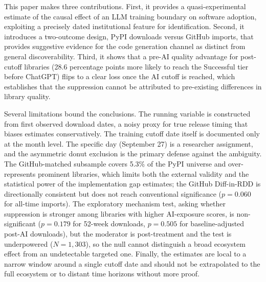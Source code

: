 \documentclass[12pt, a4paper]{report}
\begin{document}
This paper makes three contributions. First, it provides a quasi-experimental estimate of the causal effect of an LLM training boundary on software adoption, exploiting a precisely dated institutional feature for identification. Second, it introduces a two-outcome design, PyPI downloads versus GitHub imports, that provides suggestive evidence for the code generation channel as distinct from general discoverability. Third, it shows that a pre-AI quality advantage for post-cutoff libraries (28.6 percentage points more likely to reach the Successful tier before ChatGPT) flips to a clear loss once the AI cutoff is reached, which establishes that the suppression cannot be attributed to pre-existing differences in library quality.

Several limitations bound the conclusions. The running variable is constructed from first observed download dates, a noisy proxy for true release timing that biases estimates conservatively. The training cutoff date itself is documented only at the month level. The specific day (September 27) is a researcher assignment, and the asymmetric donut exclusion is the primary defense against the ambiguity. The GitHub-matched subsample covers 5.3\% of the PyPI universe and over-represents prominent libraries, which limits both the external validity and the statistical power of the implementation gap estimates; the GitHub Diff-in-RDD is directionally consistent but does not reach conventional significance ($p = 0.060$ for all-time imports). The exploratory mechanism test, asking whether suppression is stronger among libraries with higher AI-exposure scores, is non-significant ($p = 0.179$ for 52-week downloads, $p = 0.505$ for baseline-adjusted post-AI downloads), but the moderator is post-treatment and the test is underpowered ($N = 1{,}303$), so the null cannot distinguish a broad ecosystem effect from an undetectable targeted one. Finally, the estimates are local to a narrow window around a single cutoff date and should not be extrapolated to the full ecosystem or to distant time horizons without more proof.
\end{document}
